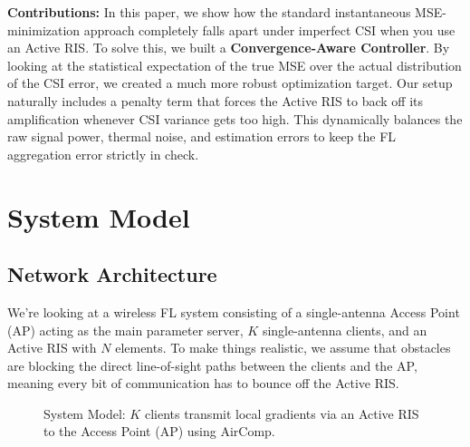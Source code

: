 \documentclass[lettersize,journal]{IEEEtran}
\begin{document}
\textbf{Contributions:} In this paper, we show how the standard instantaneous MSE-minimization approach completely falls apart under imperfect CSI when you use an Active RIS. To solve this, we built a \textbf{Convergence-Aware Controller}. By looking at the statistical expectation of the true MSE over the actual distribution of the CSI error, we created a much more robust optimization target. Our setup naturally includes a penalty term that forces the Active RIS to back off its amplification whenever CSI variance gets too high. This dynamically balances the raw signal power, thermal noise, and estimation errors to keep the FL aggregation error strictly in check.

\section{System Model}

\subsection{Network Architecture}
We're looking at a wireless FL system consisting of a single-antenna Access Point (AP) acting as the main parameter server, $K$ single-antenna clients, and an Active RIS with $N$ elements. To make things realistic, we assume that obstacles are blocking the direct line-of-sight paths between the clients and the AP, meaning every bit of communication has to bounce off the Active RIS.

\begin{figure}[htbp]
\centering
{}
\caption{System Model: $K$ clients transmit local gradients via an Active RIS to the Access Point (AP) using AirComp.}
\label{fig:sys_model}
\end{figure}
\end{document}
